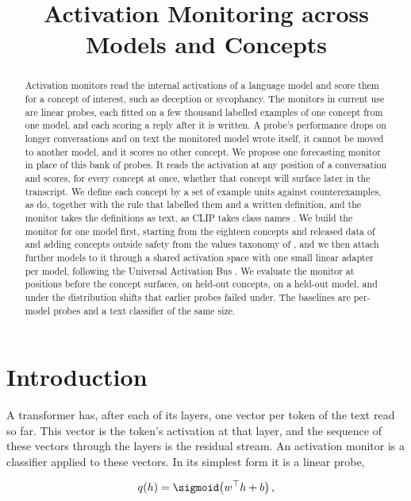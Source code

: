 \documentclass{article}
\title{\Large Activation Monitoring across Models and Concepts}
\author{}
\date{}
\begin{document}
\maketitle
{}

\begin{abstract}
Activation monitors read the internal activations of a language model and score them for a concept of interest, such as deception or sycophancy. The monitors in current use are linear probes, each fitted on a few thousand labelled examples of one concept from one model, and each scoring a reply after it is written. A probe's performance drops on longer conversations and on text the monitored model wrote itself, it cannot be moved to another model, and it scores no other concept. We propose one forecasting monitor in place of this bank of probes. It reads the activation at any position of a conversation and scores, for every concept at once, whether that concept will surface later in the transcript. We define each concept by a set of example units against counterexamples, as \cite{kim2018tcav} do, together with the rule that labelled them and a written definition, and the monitor takes the definitions as text, as CLIP takes class names \citep{radford2021}. We build the monitor for one model first, starting from the eighteen concepts and released data of \cite{zhou2026} and adding concepts outside safety from the values taxonomy of \cite{huang2025values}, and we then attach further models to it through a shared activation space with one small linear adapter per model, following the Universal Activation Bus \citep{kim2026bus}. We evaluate the monitor at positions before the concept surfaces, on held-out concepts, on a held-out model, and under the distribution shifts that earlier probes failed under. The baselines are per-model probes and a text classifier of the same size.
\end{abstract}

\section{Introduction}

A transformer has, after each of its layers, one vector per token of the text read so far. This vector is the token's activation at that layer, and the sequence of these vectors through the layers is the residual stream. An activation monitor is a classifier applied to these vectors. In its simplest form it is a linear probe,

\begin{equation}
q(h) = \sigmoid\!\left(w^\top h + b\right),
\label{eq:probe}
\end{equation}
\end{document}
